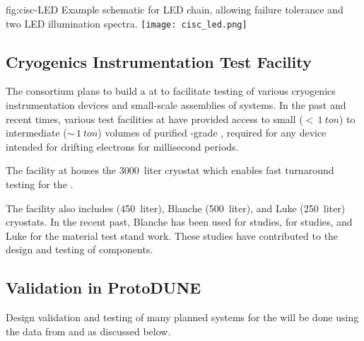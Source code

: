 \begin{dunefigure}{fig:cisc-LED}
  {Example schematic for LED chain, allowing failure tolerance and two LED illumination spectra.}
  \texttt{[image: cisc\_led.png]}
\end{dunefigure}


\subsection{Cryogenics Instrumentation Test Facility}
The  consortium plans to build a  at  to facilitate testing of various cryogenics instrumentation devices and small-scale assemblies of  systems. 
In the past and recent times, various test facilities at  have provided access to small ($<\,\SI{1}{ton}$) to intermediate ($\sim\,\SI{1}{ton}$) volumes of purified -grade , required for %
any device intended for drifting electrons for millisecond periods. 


The  facility at  houses the  \SI {3000} {liter} cryostat which enables fast turnaround testing for the  . 

The  facility also includes   (\SI {450} {liter}), Blanche (\SI {500} {liter}), and Luke (\SI {250} {liter}) cryostats. %
In the recent past, Blanche has been used for  studies,   for  studies, and Luke for the material test stand work. These studies have contributed to the design and testing of   components.

\subsection{Validation in ProtoDUNE}
\label{sec:pdsp-cryo-valid}

Design validation and testing of many planned  systems for
the  will be done using the data from
 and  as discussed below.

